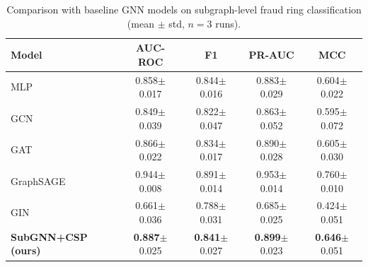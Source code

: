 \begin{table}[t]
\centering
\caption{Comparison with baseline GNN models on subgraph-level fraud ring classification (mean $\pm$ std, $n=3$ runs).}
\label{tab:baselines}
\begin{tabular}{lcccc}
\toprule
\textbf{Model} & \textbf{AUC-ROC} & \textbf{F1} & \textbf{PR-AUC} & \textbf{MCC} \\
\midrule
MLP                  & 0.858$\pm$0.017 & 0.844$\pm$0.016 & 0.883$\pm$0.029 & 0.604$\pm$0.022 \\
GCN                  & 0.849$\pm$0.039 & 0.822$\pm$0.047 & 0.863$\pm$0.052 & 0.595$\pm$0.072 \\
GAT                  & 0.866$\pm$0.022 & 0.834$\pm$0.017 & 0.890$\pm$0.028 & 0.605$\pm$0.030 \\
GraphSAGE            & 0.944$\pm$0.008 & 0.891$\pm$0.014 & 0.953$\pm$0.014 & 0.760$\pm$0.010 \\
GIN                  & 0.661$\pm$0.036 & 0.788$\pm$0.031 & 0.685$\pm$0.025 & 0.424$\pm$0.051 \\
\midrule
\textbf{SubGNN+CSP (ours)} & \textbf{0.887}$\pm$0.025 & \textbf{0.841}$\pm$0.027 & \textbf{0.899}$\pm$0.023 & \textbf{0.646}$\pm$0.051 \\
\bottomrule
\end{tabular}
\end{table}
